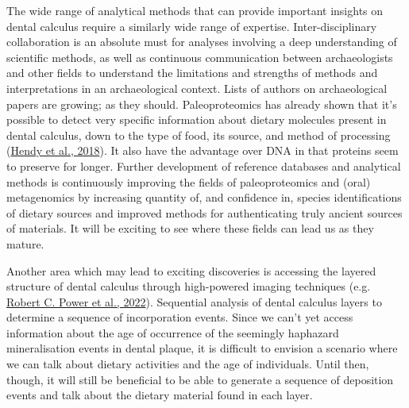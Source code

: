 \documentclass[
  letterpaper,
]{book}
\begin{document}
The wide range of analytical methods that can provide important insights
on dental calculus require a similarly wide range of expertise.
Inter-disciplinary collaboration is an absolute must for analyses
involving a deep understanding of scientific methods, as well as
continuous communication between archaeologists and other fields to
understand the limitations and strengths of methods and interpretations
in an archaeological context. Lists of authors on archaeological papers
are growing; as they should. Paleoproteomics has already shown that it's
possible to detect very specific information about dietary molecules
present in dental calculus, down to the type of food, its source, and
method of processing
(\protect\hyperlink{ref-hendyProteomicCalculus2018}{Hendy et al.,
2018}). It also have the advantage over DNA in that proteins seem to
preserve for longer. Further development of reference databases and
analytical methods is continuously improving the fields of
paleoproteomics and (oral) metagenomics by increasing quantity of, and
confidence in, species identifications of dietary sources and improved
methods for authenticating truly ancient sources of materials. It will
be exciting to see where these fields can lead us as they mature.

Another area which may lead to exciting discoveries is accessing the
layered structure of dental calculus through high-powered imaging
techniques (e.g.
\protect\hyperlink{ref-powerSynchrotronRadiationbased2022}{Robert C.
Power et al., 2022}). Sequential analysis of dental calculus layers to
determine a sequence of incorporation events. Since we can't yet access
information about the age of occurrence of the seemingly haphazard
mineralisation events in dental plaque, it is difficult to envision a
scenario where we can talk about dietary activities and the age of
individuals. Until then, though, it will still be beneficial to be able
to generate a sequence of deposition events and talk about the dietary
material found in each layer.
\end{document}
